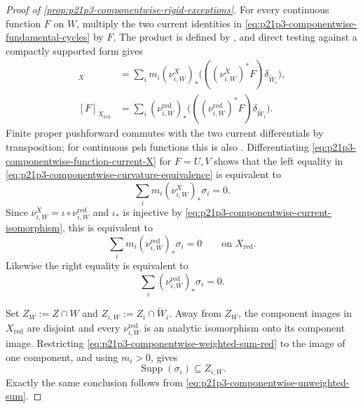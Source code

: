 \begin{proof}[Proof of
\cref{prop:p21p3-componentwise-rigid-exceptions}]
For every continuous function $F$ on $W$, multiply the two current
identities in \eqref{eq:p21p3-componentwise-fundamental-cycles} by $F$.
The product is defined by \cite[Example~7.2.12]{CLD25}, and direct testing
against a compactly supported form gives
\begin{align}
 [F]_X
 &=\sum_i m_i(\nu_{i,W}^X)_*
       \bigl(((\nu_{i,W}^X)^*F)\delta_{\widetilde W_i}\bigr),
 \label{eq:p21p3-componentwise-function-current-X}\\
 [F]_{X_{\mathrm{red}}}
 &=\sum_i(\nu_{i,W}^{\mathrm{red}})_*
       \bigl(((\nu_{i,W}^{\mathrm{red}})^*F)
                              \delta_{\widetilde W_i}\bigr).
 \label{eq:p21p3-componentwise-function-current-red}
\end{align}
Finite proper pushforward commutes with the two current differentials by
transposition; for continuous psh functions this is also
\cite[Proposition~8.5.6]{CLD25}.  Differentiating
\eqref{eq:p21p3-componentwise-function-current-X} for $F=U,V$ shows that
the left equality in
\eqref{eq:p21p3-componentwise-curvature-equivalence} is equivalent to
\begin{equation}
 \label{eq:p21p3-componentwise-weighted-sum}
                 \sum_i m_i(\nu_{i,W}^X)_*\sigma_i=0.
\end{equation}
Since $\nu_{i,W}^X=\iota\circ\nu_{i,W}^{\mathrm{red}}$ and $\iota_*$ is
injective by \eqref{eq:p21p3-componentwise-current-isomorphism}, this is
equivalent to
\begin{equation}
 \label{eq:p21p3-componentwise-weighted-sum-red}
       \sum_i m_i(\nu_{i,W}^{\mathrm{red}})_*\sigma_i=0
       \qquad\text{on }X_{\mathrm{red}}.
\end{equation}
Likewise the right equality is equivalent to
\begin{equation}
 \label{eq:p21p3-componentwise-unweighted-sum}
                 \sum_i(\nu_{i,W}^{\mathrm{red}})_*\sigma_i=0.
\end{equation}

Set $Z_W:=Z\cap W$ and
$Z_{i,W}:=Z_i\cap\widetilde W_i$.  Away from $Z_W$, the component images in
$X_{\mathrm{red}}$ are disjoint and every $\nu_{i,W}^{\mathrm{red}}$ is an
analytic isomorphism onto its component image.  Restricting
\eqref{eq:p21p3-componentwise-weighted-sum-red} to the image of one component,
and using $m_i>0$, gives
\begin{equation}
 \label{eq:p21p3-componentwise-support}
                    \operatorname{Supp}(\sigma_i)\subseteq Z_{i,W}.
\end{equation}
Exactly the same conclusion follows from
\eqref{eq:p21p3-componentwise-unweighted-sum}.


\end{proof}
